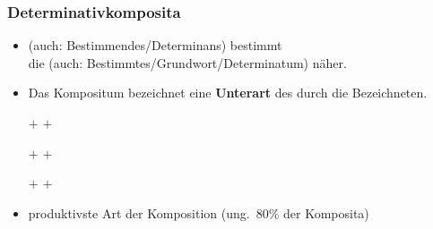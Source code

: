\begin{frame}
\frametitle{Determinativkomposita}

\begin{itemize}
	\item {} (auch: Bestimmendes/Determinans) bestimmt\\
	die  (auch: Bestimmtes/Grundwort/Determinatum) näher.

	\item Das Kompositum bezeichnet eine \textbf{Unterart} des durch die  Bezeichneten.

	\settowidth{}
	\ea 
		\ea {}$+$ 
		\ex {}$+$ 
		\z
	
	\ex 
		\ea {}$+$ 
		\ex {}$+$ 
		\z
	
	\ex 	
		\ea {}$+$ 
		\ex {}$+$ 
		\z 
	\z
	
	\item produktivste Art der Komposition (ung.\ 80\% der Komposita)
\end{itemize}

\end{frame}


